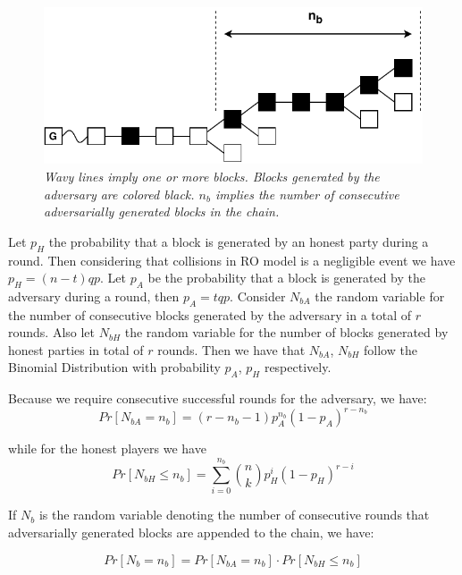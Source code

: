 \documentclass[10pt,a4paper]{article}
\theoremstyle{plain}
\theoremstyle{definition}
\theoremstyle{lemma}
\begin{document}
\begin{figure}[h!]
	\begin{center}
		\includegraphics[scale=0.75]{figures/infix_delay.pdf}
	\end{center}
	\caption{\textit{Wavy lines imply one or more blocks. Blocks generated by the
	 adversary are colored black. \textbf{$n_b$} implies the number of consecutive
	 adversarially generated blocks in the chain.}}
	\label{fig:infix_delay}
\end{figure}

Let $p_H$ the probability that a block is generated by an honest party during a round.
Then considering that collisions in RO model is a negligible event we have
$p_H = (n-t)qp$. Let $p_A$ be the probability that a block is generated by the
adversary during a round, then $p_A = tqp$. Consider $N_{bA}$ the random variable
for the number of consecutive blocks generated by the adversary in a total of $r$
rounds. Also let $N_{bH}$ the random variable for the number of blocks generated by
honest parties in total of $r$ rounds. 
Then we have that $N_{bA}$, $N_{bH}$ follow the Binomial Distribution with
probability $p_A$, $p_H$ respectively.

Because we require consecutive successful rounds for the adversary, we have:
\begin{equation}
	Pr[N_{bA} = n_b] = (r-n_b - 1) p_A^{n_b}(1-p_A)^{r-n_b}
\end{equation}

while for the honest players we have 
\begin{equation}
	Pr[N_{bH} \leq n_b] = \sum_{i=0}^{n_b} \binom nk p_H^{i}(1-p_H)^{r-i}
\end{equation}

If $N_b$ is the random variable denoting the number of consecutive rounds that
adversarially generated blocks are appended to the chain, we have:

\begin{equation}
	Pr[N_b = n_b] = Pr[N_{bA} = n_b] \cdot Pr[N_{bH} \leq n_b]
\end{equation}
\end{document}

